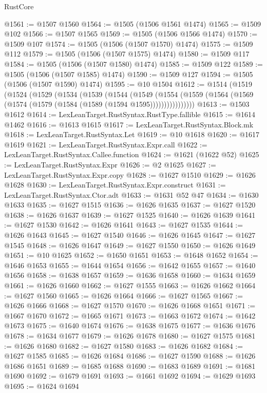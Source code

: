 \begin{lexlean}{RustCore}
\begin{coremodule}
@1561 := @1507 @1560
@1564 := @1505 (@1506 @1561 @1474)
@1565 := @1509 @102
@1566 := @1507 @1565
@1569 := @1505 (@1506 @1566 @1474)
@1570 := @1509 @107
@1574 := @1505 (@1506 (@1507 @1570) @1474)
@1575 := @1509 @112
@1579 := @1505 (@1506 (@1507 @1575) @1474)
@1580 := @1509 @117
@1584 := @1505 (@1506 (@1507 @1580) @1474)
@1585 := @1509 @122
@1589 := @1505 (@1506 (@1507 @1585) @1474)
@1590 := @1509 @127
@1594 := @1505 (@1506 (@1507 @1590) @1474)
@1595 := @10 @1504
@1612 := @1514
    (@1519
      (@1524
        (@1529
          (@1534
            (@1539
              (@1544
                (@1549
                  (@1554
                    (@1559 (@1564 (@1569 (@1574 (@1579 (@1584 (@1589 (@1594 @1595))))))))))))))))
@1613 := @1503 @1612
@1614 := LexLeanTarget.RustSyntax.RustType.fallible
@1615 := @1614 @1462
@1616 := @1613 @1615
@1617 := LexLeanTarget.RustSyntax.Block.mk
@1618 := LexLeanTarget.RustSyntax.Let
@1619 := @10 @1618
@1620 := @1617 @1619
@1621 := LexLeanTarget.RustSyntax.Expr.call
@1622 := LexLeanTarget.RustSyntax.Callee.function
@1624 := @1621 (@1622 @52)
@1625 := LexLeanTarget.RustSyntax.Expr
@1626 := @2 @1625
@1627 := LexLeanTarget.RustSyntax.Expr.copy
@1628 := @1627 @1510
@1629 := @1626 @1628
@1630 := LexLeanTarget.RustSyntax.Expr.construct
@1631 := LexLeanTarget.RustSyntax.Ctor.adt
@1633 := @1631 @52 @47
@1634 := @1630 @1633
@1635 := @1627 @1515
@1636 := @1626 @1635
@1637 := @1627 @1520
@1638 := @1626 @1637
@1639 := @1627 @1525
@1640 := @1626 @1639
@1641 := @1627 @1530
@1642 := @1626 @1641
@1643 := @1627 @1535
@1644 := @1626 @1643
@1645 := @1627 @1540
@1646 := @1626 @1645
@1647 := @1627 @1545
@1648 := @1626 @1647
@1649 := @1627 @1550
@1650 := @1626 @1649
@1651 := @10 @1625
@1652 := @1650 @1651
@1653 := @1648 @1652
@1654 := @1646 @1653
@1655 := @1644 @1654
@1656 := @1642 @1655
@1657 := @1640 @1656
@1658 := @1638 @1657
@1659 := @1636 @1658
@1660 := @1634 @1659
@1661 := @1626 @1660
@1662 := @1627 @1555
@1663 := @1626 @1662
@1664 := @1627 @1560
@1665 := @1626 @1664
@1666 := @1627 @1565
@1667 := @1626 @1666
@1668 := @1627 @1570
@1670 := @1626 @1668 @1651
@1671 := @1667 @1670
@1672 := @1665 @1671
@1673 := @1663 @1672
@1674 := @1642 @1673
@1675 := @1640 @1674
@1676 := @1638 @1675
@1677 := @1636 @1676
@1678 := @1634 @1677
@1679 := @1626 @1678
@1680 := @1627 @1575
@1681 := @1626 @1680
@1682 := @1627 @1580
@1683 := @1626 @1682
@1684 := @1627 @1585
@1685 := @1626 @1684
@1686 := @1627 @1590
@1688 := @1626 @1686 @1651
@1689 := @1685 @1688
@1690 := @1683 @1689
@1691 := @1681 @1690
@1692 := @1679 @1691
@1693 := @1661 @1692
@1694 := @1629 @1693
@1695 := @1624 @1694

\end{coremodule}
\end{lexlean}
